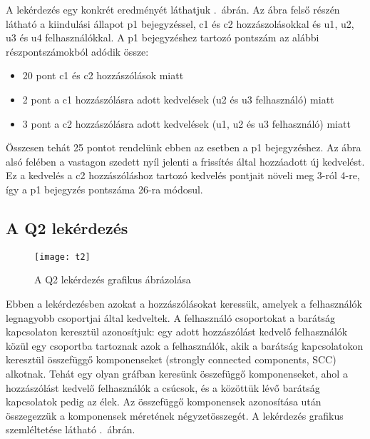 A lekérdezés egy konkrét eredményét láthatjuk .~ábrán. Az ábra felső részén látható a kiindulási állapot \textsf{p1} bejegyzéssel, \textsf{c1} és \textsf{c2} hozzászolásokkal és \textsf{u1}, \textsf{u2}, \textsf{u3} és \textsf{u4} felhasználókkal. A \textsf{p1} bejegyzéshez tartozó pontszám az alábbi részpontszámokból adódik össze:
\begin{itemize}
	\item 20 pont \textsf{c1} és \textsf{c2} hozzászólások miatt
	\item 2 pont a \textsf{c1} hozzászólásra adott kedvelések (\textsf{u2} és \textsf{u3} felhasználó) miatt
	\item 3 pont a \textsf{c2} hozzászólásra adott kedvelések (\textsf{u1}, \textsf{u2} és \textsf{u3} felhasználó) miatt
\end{itemize}
Összesen tehát 25 pontot rendelünk ebben az esetben a \textsf{p1} bejegyzéshez. Az ábra alsó felében a vastagon szedett nyíl jelenti a frissítés által hozzáadott új kedvelést. Ez a kedvelés a \textsf{c2} hozzászóláshoz tartozó kedvelés pontjait növeli meg 3-ról 4-re, így a \textsf{p1} bejegyzés pontszáma 26-ra módosul.

\subsection{A Q2 lekérdezés}

\begin{figure}[ht]
	\centering
	\texttt{[image: t2]}	
	\caption{A Q2 lekérdezés grafikus ábrázolása}
	\label{fig:ttc-t2}
\end{figure}

Ebben a lekérdezésben azokat a hozzászólásokat keressük, amelyek a felhasználók legnagyobb csoportjai által kedveltek. A felhasználó csoportokat a barátság kapcsolaton keresztül azonosítjuk: egy adott hozzászólást kedvelő felhasználók közül egy csoportba tartoznak azok a felhasználók, akik a barátság kapcsolatokon keresztül összefüggő komponenseket (strongly connected components, SCC) alkotnak.
Tehát egy olyan gráfban keresünk összefüggő komponenseket, ahol a hozzászólást kedvelő felhasználók a csúcsok, és a közöttük lévő barátság kapcsolatok pedig az élek. Az összefüggő komponensek azonosítása után összegezzük a komponensek méretének négyzetösszegét. A lekérdezés grafikus szemléltetése látható .~ábrán.

